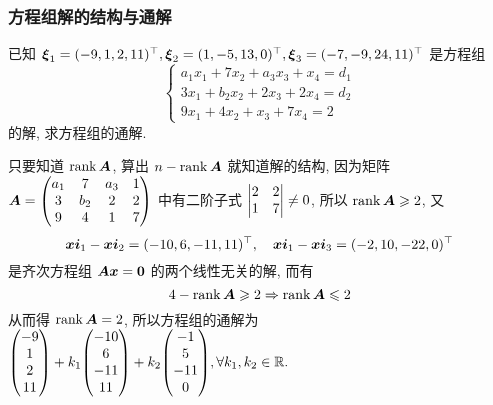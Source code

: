 \subsubsection{方程组解的结构与通解}

\begin{example}
    已知 $\vb*{\xi}_1=(-9,1,2,11)^\top, \vb*{\xi}_2=(1,-5,13,0)^\top, \vb*{\xi}_3=(-7,-9,24,11)^\top$ 是方程组
    $$
    \begin{cases}
        a_1x_1+7x_2+a_3x_3+x_4=d_1\\ 3x_1+b_2x_2+2x_3+2x_4=d_2\\9x_1+4x_2+x_3+7x_4=2
    \end{cases}
    $$的解, 求方程组的通解.
\end{example}
\begin{solution}
    只要知道 $\rank\vb*{A}$, 算出 $n-\rank\vb*{A}$ 就知道解的结构, 因为矩阵 $\vb*{A}=\begin{pmatrix} a_1 & 7 & a_3 & 1\\ 3 & b_2 & 2 & 2\\ 9 & 4 & 1 & 7\\\end{pmatrix}$ 中有二阶子式 $\mqty|2&2\\1&7|\neq0$, 所以 $\rank\vb*{A}\geqslant 2$, 又 
    $$
    \vb*{xi}_1-\vb*{xi}_2=(-10,6,-11,11)^\top, \quad \vb*{xi}_1-\vb*{xi}_3=(-2,10,-22,0)^\top
    $$
    是齐次方程组 $\vb*{Ax}=\vb*{0}$ 的两个线性无关的解, 而有 $$4-\rank\vb*{A}\geqslant 2\Rightarrow \rank\vb*{A}\leqslant 2$$
    从而得 $\rank\vb*{A}=2$, 所以方程组的通解为 $\mqty(-9\\1\\2\\11)+k_1\mqty(-10\\6\\-11\\11)+k_2\mqty(-1\\5\\-11\\0),\forall k_1,k_2\in \mathbb{R}.$
\end{solution}

